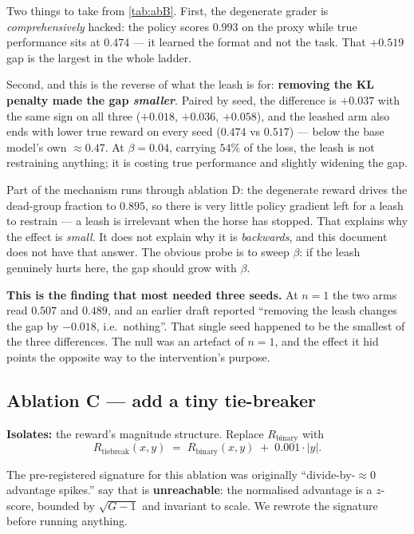 \documentclass[11pt,letterpaper]{article}
\theoremstyle{definition}
\begin{document}
Two things to take from \cref{tab:abB}. First, the degenerate grader is \emph{comprehensively}
hacked: the policy scores $0.993$ on the proxy while true performance sits at $0.474$ --- it learned
the format and not the task. That $+0.519$ gap is the largest in the whole ladder.

Second, and this is the reverse of what the leash is for: \textbf{removing the KL penalty made the
gap \emph{smaller}}. Paired by seed, the difference is $+0.037$ with the same sign on all three
($+0.018$, $+0.036$, $+0.058$), and the leashed arm also ends with lower true reward on every seed
($0.474$ vs $0.517$) --- below the base model's own $\approx 0.47$. At $\beta = 0.04$, carrying
$54\%$ of the loss, the leash is not restraining anything; it is costing true performance and
slightly widening the gap.

Part of the mechanism runs through ablation D: the degenerate reward drives the dead-group fraction
to $0.895$, so there is very little policy gradient left for a leash to restrain --- a leash is
irrelevant when the horse has stopped. That explains why the effect is \emph{small}. It does not
explain why it is \emph{backwards}, and this document does not have that answer. The obvious probe
is to sweep $\beta$: if the leash genuinely hurts here, the gap should grow with $\beta$.

\begin{aside}
\textbf{This is the finding that most needed three seeds.} At $n=1$ the two arms read $0.507$ and
$0.489$, and an earlier draft reported ``removing the leash changes the gap by $-0.018$, i.e.\
nothing''. That single seed happened to be the smallest of the three differences. The null was an
artefact of $n=1$, and the effect it hid points the opposite way to the intervention's purpose.
\end{aside}

\subsection{Ablation C --- add a tiny tie-breaker}
\label{sec:abC}

\textbf{Isolates:} the reward's magnitude structure. Replace $R_{\text{binary}}$ with
\begin{equation}
  R_{\text{tiebreak}}(x,y) \;=\; R_{\text{binary}}(x,y) \;+\; 0.001 \cdot |y| .
\end{equation}

The pre-registered signature for this ablation was originally ``divide-by-$\approx 0$ advantage
spikes.'' \Cref{claim:bound,claim:scaleinv} say that is \textbf{unreachable}: the normalised advantage
is a $z$-score, bounded by $\sqrt{G-1}$ and invariant to scale. We rewrote the signature before
running anything.
\end{document}

